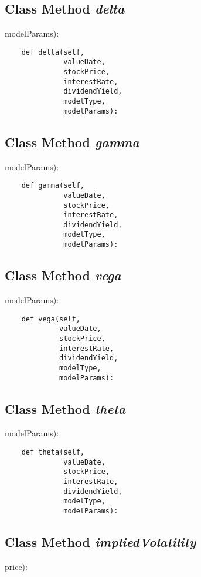 \documentclass[twoside,11pt]{book}
\begin{document}
\subsection{Class Method {\it delta}}
modelParams):

\begin{lstlisting}
    def delta(self,
              valueDate,
              stockPrice,
              interestRate,
              dividendYield,
              modelType,
              modelParams):
\end{lstlisting}

\subsection{Class Method {\it gamma}}
modelParams):

\begin{lstlisting}
    def gamma(self,
              valueDate,
              stockPrice,
              interestRate,
              dividendYield,
              modelType,
              modelParams):
\end{lstlisting}

\subsection{Class Method {\it vega}}
modelParams):

\begin{lstlisting}
    def vega(self,
             valueDate,
             stockPrice,
             interestRate,
             dividendYield,
             modelType,
             modelParams):
\end{lstlisting}

\subsection{Class Method {\it theta}}
modelParams):

\begin{lstlisting}
    def theta(self,
              valueDate,
              stockPrice,
              interestRate,
              dividendYield,
              modelType,
              modelParams):
\end{lstlisting}

\subsection{Class Method {\it impliedVolatility}}
price):
\end{document}
